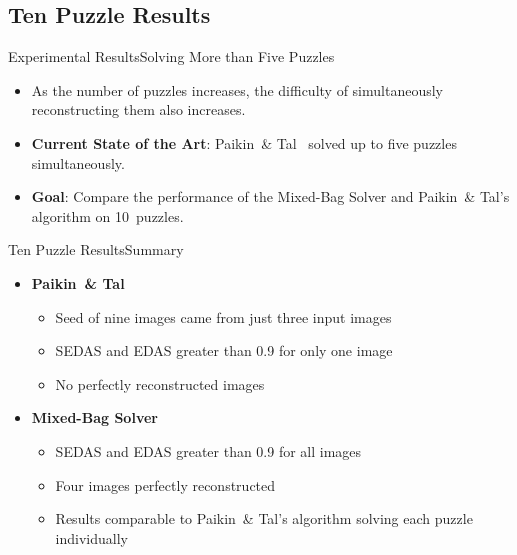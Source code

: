 \documentclass[10pt]{beamer}
\newcommand{\backupend}{
   \setcounter{framenumber}{\value{finalframe}}
}
\begin{document}
\subsection{Ten Puzzle Results}
\begin{frame}{Experimental Results}{Solving More than Five Puzzles}
  \begin{itemize}
	  \item<1-> As the number of puzzles increases, the difficulty of simultaneously reconstructing them also increases.
	  \vfill  
  	\item<2-> \textbf{Current State of the Art}: Paikin~\& Tal~\cite{paikin2015} solved up to five puzzles simultaneously.
	  \vfill
  	\item<3-> \textbf{Goal}: Compare the performance of the Mixed-Bag Solver and Paikin~\& Tal's algorithm on 10~puzzles.
  \end{itemize}
\end{frame}


\begin{frame}{Ten Puzzle Results}{Summary}
  	\begin{itemize}
  		\item<1-> \textbf{Paikin~\& Tal}
  	  \vspace{0.4em}
  		\begin{itemize}
  		  \setlength\itemsep{0.7em}
			  \item Seed of nine images came from just three input images
			  \item SEDAS and EDAS greater than 0.9 for only one image
			  \item No perfectly reconstructed images
		  \end{itemize}
		  \vfill
  	  \item<2-> \textbf{Mixed-Bag Solver}
  	  \vspace{0.4em}
		  \begin{itemize}
		    \setlength\itemsep{0.7em}
			  \item SEDAS and EDAS greater than 0.9 for all images
			  \item Four images perfectly reconstructed
			  \item Results comparable to Paikin~\& Tal's algorithm solving each puzzle individually
		  \end{itemize}	
  \end{itemize}
\end{frame}





\backupend
\end{document}
